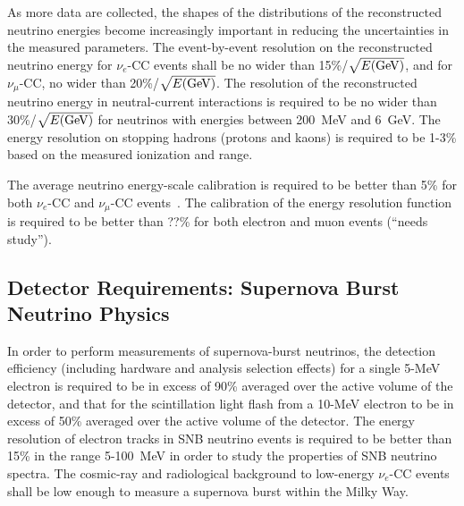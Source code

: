 As more data are collected, the shapes of the distributions of the
reconstructed neutrino energies become increasingly important in
reducing the uncertainties in the measured parameters.  The event-by-event resolution on the reconstructed neutrino
energy for $\nu_e$-CC events %
shall be no wider than 15\%/$\sqrt{E({\rm GeV})}$,
 and for $\nu_\mu$-CC, no wider than 20\%/$\sqrt{E({\rm GeV})}$.  
The resolution of the reconstructed neutrino energy in
neutral-current interactions is required to be no wider than
30\%/$\sqrt{E({\rm GeV})}$ for neutrinos with energies between 200~MeV
and 6~GeV.  The energy resolution on stopping hadrons (protons and kaons) is required
to be 1-3\% based on the measured ionization and range.

The average neutrino energy-scale calibration is required
to be better than 5\% for both $\nu_e$-CC and $\nu_\mu$-CC
events~\cite{fd_8741}.  %
The calibration of the energy resolution function is required to be better than ??\%
for both electron and muon events (``needs study'').

\subsection{Detector Requirements: Supernova Burst Neutrino Physics}

In order to perform measurements of supernova-burst neutrinos, %
the detection efficiency (including hardware and analysis
selection effects) for a single 5-MeV electron is required to be in excess of 90\%
averaged over the active volume of the detector, and that %
for the scintillation light flash from a 10-MeV
electron to be in excess of 50\% averaged over the active volume of the
detector.  The energy resolution of electron tracks in SNB neutrino
events is required to be better than 15\% in the range 5-100~MeV in
order to study the properties of SNB neutrino spectra.  The cosmic-ray
and radiological background to low-energy $\nu_e$-CC events shall be low enough to measure
a supernova burst within the Milky Way.

